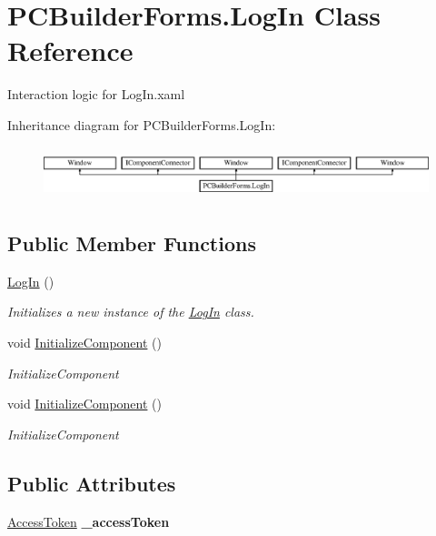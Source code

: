 \hypertarget{class_p_c_builder_forms_1_1_log_in}{}\section{P\+C\+Builder\+Forms.\+Log\+In Class Reference}
\label{class_p_c_builder_forms_1_1_log_in}


Interaction logic for Log\+In.\+xaml  


Inheritance diagram for P\+C\+Builder\+Forms.\+Log\+In\+:\begin{figure}[H]
\begin{center}
\leavevmode
\includegraphics[height=1.523810cm]{class_p_c_builder_forms_1_1_log_in}
\end{center}
\end{figure}
\subsection*{Public Member Functions}
\begin{DoxyCompactItemize}
\item 
\hyperlink{class_p_c_builder_forms_1_1_log_in_a6a3ae2b82b608bdcdd99070a94e3a7c0}{Log\+In} ()
\begin{DoxyCompactList}\small\item\em Initializes a new instance of the \hyperlink{class_p_c_builder_forms_1_1_log_in}{Log\+In} class. \end{DoxyCompactList}\item 
void \hyperlink{class_p_c_builder_forms_1_1_log_in_ae0b7f84ba6cfe669a10e079fda5ab05d}{Initialize\+Component} ()
\begin{DoxyCompactList}\small\item\em Initialize\+Component \end{DoxyCompactList}\item 
void \hyperlink{class_p_c_builder_forms_1_1_log_in_ae0b7f84ba6cfe669a10e079fda5ab05d}{Initialize\+Component} ()
\begin{DoxyCompactList}\small\item\em Initialize\+Component \end{DoxyCompactList}\end{DoxyCompactItemize}
\subsection*{Public Attributes}
\begin{DoxyCompactItemize}
\item 
\hyperlink{class_business_objects_1_1_access_token}{Access\+Token} {\bfseries \+\_\+access\+Token}\hypertarget{class_p_c_builder_forms_1_1_log_in_a14d70ed974c56e1a0b92cc3c7b9f23da}{}\label{class_p_c_builder_forms_1_1_log_in_a14d70ed974c56e1a0b92cc3c7b9f23da}

\end{DoxyCompactItemize}
